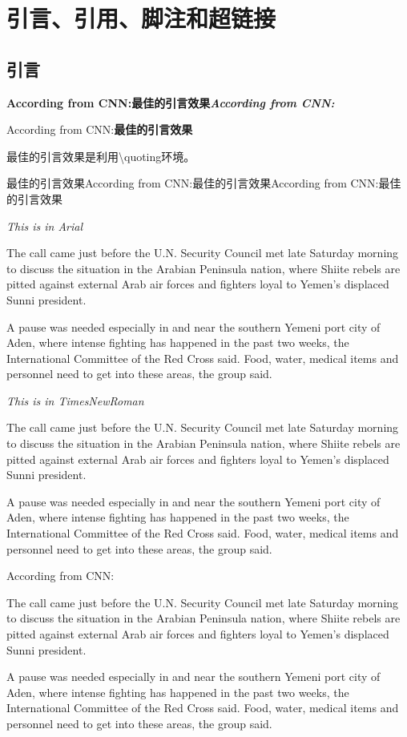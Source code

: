 \clearpage
\section{引言、引用、脚注和超链接}

\subsection{引言}

{\bfseries{According from CNN:最佳的引言效果\textit{According from CNN:}}}

{{According from CNN:\bfseries{最佳的引言效果}}}

最佳的引言效果是利用\textbackslash{}quoting环境。

最佳的引言效果According from CNN:最佳的引言效果According from CNN:最佳的引言效果
{\Arial

\emph{This is in Arial}

The call came just before the U.N. Security Council met late Saturday morning to discuss the situation in the Arabian Peninsula nation, where Shiite rebels are pitted against external Arab air forces and fighters loyal to Yemen's displaced Sunni president.

A pause was needed especially in and near the southern Yemeni port city of Aden, where intense fighting has happened in the past two weeks, the International Committee of the Red Cross said. Food, water, medical items and personnel need to get into these areas, the group said.
}

{\TimesNewRoman
\emph{This is in TimesNewRoman}

The call came just before the U.N. Security Council met late Saturday morning to discuss the situation in the Arabian Peninsula nation, where Shiite rebels are pitted against external Arab air forces and fighters loyal to Yemen's displaced Sunni president.

A pause was needed especially in and near the southern Yemeni port city of Aden, where intense fighting has happened in the past two weeks, the International Committee of the Red Cross said. Food, water, medical items and personnel need to get into these areas, the group said.
}

According from CNN:

\begin{QuoteEnglish}
The call came just before the U.N. Security Council met late Saturday morning to discuss the situation in the Arabian Peninsula nation, where Shiite rebels are pitted against external Arab air forces and fighters loyal to Yemen's displaced Sunni president.

A pause was needed especially in and near the southern Yemeni port city of Aden, where intense fighting has happened in the past two weeks, the International Committee of the Red Cross said. Food, water, medical items and personnel need to get into these areas, the group said.
\end{QuoteEnglish}

